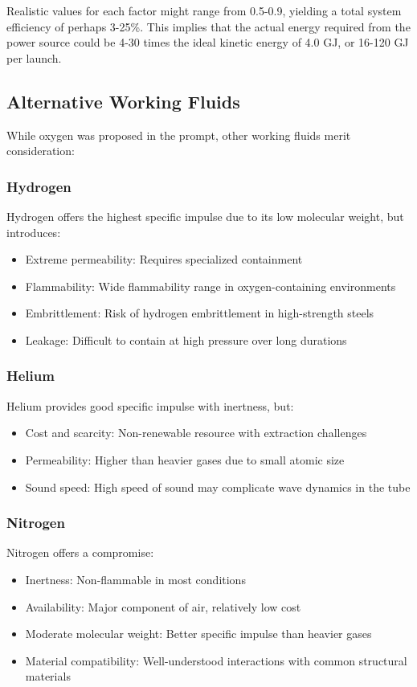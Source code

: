 \documentclass{article}
\begin{document}
Realistic values for each factor might range from 0.5-0.9, yielding a total system efficiency of perhaps 3-25\%. This implies that the actual energy required from the power source could be 4-30 times the ideal kinetic energy of 4.0 GJ, or 16-120 GJ per launch.\n\n\subsection{Alternative Working Fluids}
While oxygen was proposed in the prompt, other working fluids merit consideration:\n\n\subsubsection{Hydrogen}
Hydrogen offers the highest specific impulse due to its low molecular weight, but introduces:\n\begin{itemize}
    \item Extreme permeability: Requires specialized containment\n    \item Flammability: Wide flammability range in oxygen-containing environments\n    \item Embrittlement: Risk of hydrogen embrittlement in high-strength steels\n    \item Leakage: Difficult to contain at high pressure over long durations\n\end{itemize}
\n\subsubsection{Helium}
Helium provides good specific impulse with inertness, but:\n\begin{itemize}
    \item Cost and scarcity: Non-renewable resource with extraction challenges\n    \item Permeability: Higher than heavier gases due to small atomic size\n    \item Sound speed: High speed of sound may complicate wave dynamics in the tube\n\end{itemize}
\n\subsubsection{Nitrogen}
Nitrogen offers a compromise:\n\begin{itemize}
    \item Inertness: Non-flammable in most conditions\n    \item Availability: Major component of air, relatively low cost\n    \item Moderate molecular weight: Better specific impulse than heavier gases\n    \item Material compatibility: Well-understood interactions with common structural materials\n\end{itemize}
\end{document}
